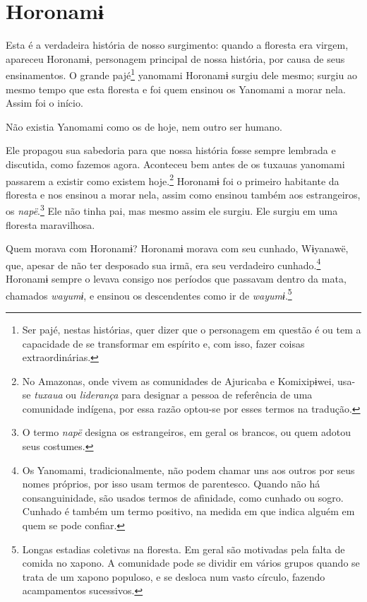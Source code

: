 \chapter{Horonamɨ}
 

Esta é a verdadeira história de nosso surgimento: quando a floresta era
virgem, apareceu Horonamɨ, personagem principal de nossa história, por
causa de seus ensinamentos. O grande pajé\footnote{Ser pajé, nestas histórias, quer dizer que o personagem em questão é ou tem a capacidade de se transformar em espírito e, com isso, fazer coisas
extraordinárias.}  yanomami Horonamɨ surgiu dele mesmo; surgiu ao mesmo tempo que esta floresta e
foi quem ensinou os Yanomami a morar nela. Assim foi o início. 

Não existia Yanomami como os de hoje, nem outro ser humano. 

Ele propagou sua sabedoria para que nossa história fosse sempre lembrada
e discutida, como fazemos agora. Aconteceu bem antes de os tuxauas
yanomami passarem a existir como existem
hoje.\footnote{No Amazonas, onde vivem as comunidades de Ajuricaba e Komixipɨwei,
usa-se \textit{tuxaua} ou \textit{liderança} para designar a pessoa de referência
de uma comunidade indígena, por essa razão optou-se por esses termos na
tradução.}  Horonamɨ foi o primeiro habitante da floresta e
nos ensinou a morar nela, assim como ensinou também aos estrangeiros,
os \textit{napë}.\footnote{O termo \textit{napë} designa os estrangeiros, em geral os brancos, ou quem adotou seus costumes.} Ele não tinha pai, mas mesmo assim
ele surgiu. Ele surgiu em uma floresta maravilhosa. 

Quem morava com Horonamɨ? Horonamɨ morava com seu cunhado, Wɨyanawë,
que, apesar de não ter desposado sua irmã, era seu verdadeiro
cunhado.\footnote{Os Yanomami, tradicionalmente, não podem chamar uns aos outros por seus nomes próprios, por isso usam termos de parentesco. Quando não há
consanguinidade, são usados termos de afinidade, como cunhado ou sogro.
Cunhado é também um termo positivo, na medida em que indica alguém em
quem se pode confiar.} Horonamɨ sempre o levava consigo nos
períodos que passavam dentro da mata, chamados \textit{wayumɨ}, e ensinou
os descendentes como ir de \textit{wayumɨ}.\footnote{Longas estadias coletivas na floresta. Em geral são motivadas pela falta de comida no xapono. A comunidade pode se dividir em vários grupos quando se trata de um xapono populoso, e se desloca num vasto círculo, fazendo acampamentos sucessivos.}

